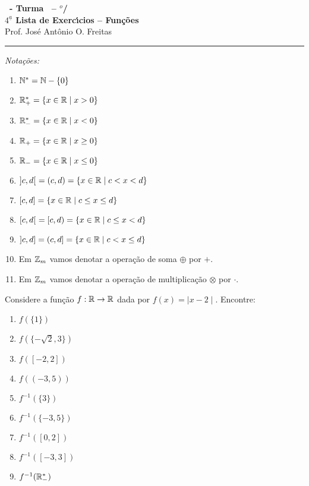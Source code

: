 \documentclass[12pt]{exam}
\begin{document}
\begin{center}
{\Large\bf \disciplina\ - Turma \turma\ -- \semestre$^{o}$/\ano} \\ \vspace{9pt} {\large\bf
  $4^{\underline{a}}$ Lista de Exerc{\'\i}cios -- Fun\c{c}\~oes}\\ \vspace{9pt} Prof. Jos{\'e} Ant{\^o}nio O. Freitas
\end{center}
\hrule

\vspace{.6cm}

\begin{center}
	\textit{Nota\c{c}\~oes:}
\end{center}
\begin{multicols}{2}
	\begin{enumerate}[label={\roman*})]
		\item $\mathbb{N}^* = \mathbb{N} - \{0\}$
		\item $\mathbb{R}^*_+ = \{x \in \mathbb{R} \mid x > 0\}$
		\item $\mathbb{R}^*_- = \{x \in \mathbb{R} \mid x < 0\}$
		\item $\mathbb{R}_+ = \{x \in \mathbb{R} \mid x \ge 0\}$
		\item $\mathbb{R}_- = \{x \in \mathbb{R} \mid x \le 0\}$
		\item $]c,d[\ = (c,d) = \{x \in \mathbb{R} \mid c < x < d\}$
		\item $[c,d] = \{x \in \mathbb{R} \mid c \le x \le d\}$
		\item $[c,d[\ = [c, d) = \{x \in \mathbb{R} \mid c \le x < d\}$
		\item $]c,d] = (c, d] = \{x \in \mathbb{R} \mid c < x \le d\}$
		\item Em $\mathbb{Z}_m$ vamos denotar a opera\c{c}\~ao de soma $\oplus$ por $+$.
		\item Em $\mathbb{Z}_m$ vamos denotar a opera\c{c}\~ao de multiplica\c{c}\~ao $\otimes$ por $\cdot$.
	\end{enumerate}
\end{multicols}

\vspace{.6cm}

\questao Considere a fun\c{c}\~ao $f : \mathbb{R} \to \mathbb{R}$ dada por $f(x) = \mid x - 2\mid$. Encontre:
\begin{multicols}{3}
	\begin{enumerate}[label={\alph*})]
		\item $f(\{1\})$
		\item $f(\{-\sqrt{2}, 3\})$
		\item $f([-2,2])$
		\item $f((-3,5))$
		\item $f^{-1}(\{3\})$
		\item $f^{-1}(\{-3,5\})$
		\item $f^{-1}([0,2])$
		\item $f^{-1}([-3,3])$
		\item $f^{-1}(\mathbb{R}^*_-)$
	\end{enumerate}
\end{multicols}
\end{document}
